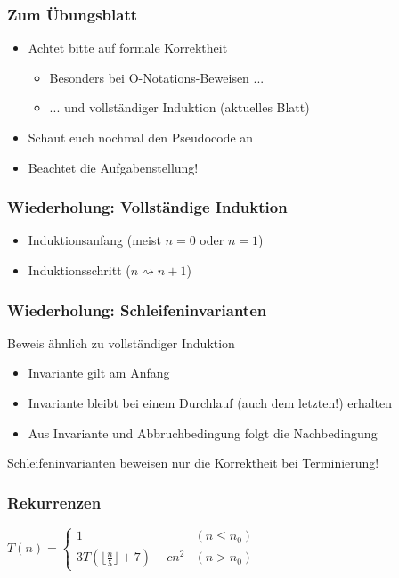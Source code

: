 

\begin{frame}
  \titlepage
\end{frame}

\begin{frame}
\frametitle{Zum Übungsblatt}
\begin{itemize}
\item Achtet bitte auf formale Korrektheit
\begin{itemize}
\item Besonders bei O-Notations-Beweisen ...
\item ... und vollständiger Induktion (aktuelles Blatt)
\end{itemize} \pause
\item Schaut euch nochmal den Pseudocode an\pause
\item Beachtet die Aufgabenstellung!
\end{itemize}
\end{frame}

\begin{frame}
\frametitle{Wiederholung: Vollständige Induktion}
\begin{itemize}
\item Induktionsanfang (meist $n=0$ oder $n=1$)
\item Induktionsschritt ($n\rightsquigarrow n+1$)
\end{itemize}
\end{frame}

\begin{frame}
\frametitle{Wiederholung: Schleifeninvarianten}
Beweis ähnlich zu vollständiger Induktion
\begin{itemize}
\item Invariante gilt am Anfang
\item Invariante bleibt bei einem Durchlauf (auch dem letzten!) erhalten
\item Aus Invariante und Abbruchbedingung folgt die Nachbedingung
\end{itemize}\pause
Schleifeninvarianten beweisen nur die Korrektheit bei Terminierung!
\end{frame}

\begin{frame}
\frametitle{Rekurrenzen}
$T(n)=\begin{cases}1 & (n\leq n_0)\\ 3T(\lfloor\frac{n}{5}\rfloor+7)+cn^2 & (n>n_0)\end{cases}$\\[2em]
\end{frame}

